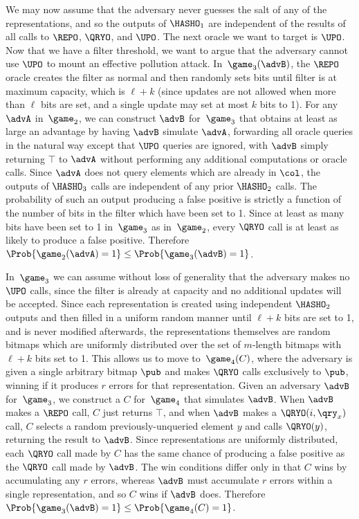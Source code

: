 We may now assume that the adversary never guesses the salt of any of the representations, and so the outputs of $\HASHO_1$ are independent of the results of all calls to $\REPO$, $\QRYO$, and $\UPO$. The next oracle we want to target is $\UPO$. Now that we have a filter threshold, we want to argue that the adversary cannot use $\UPO$ to mount an effective pollution attack. In~$\game_3(\advB)$, the $\REPO$ oracle creates the filter as normal and then randomly sets bits until filter is at maximum capacity, which is $\ell+k$ (since updates are not allowed when more than $\ell$ bits are set, and a single update may set at most $k$ bits to 1). For any $\advA$ in~$\game_2$, we can construct $\advB$ for~$\game_3$ that obtains at least as large an advantage by having $\advB$ simulate $\advA$, forwarding all oracle queries in the natural way except that $\UPO$ queries are ignored, with $\advB$ simply returning $\top$ to $\advA$ without performing any additional computations or oracle calls. Since $\advA$ does not query elements which are already in $\col$, the outputs of $\HASHO_3$ calls are independent of any prior $\HASHO_2$ calls. The probability of such an output producing a false positive is strictly a function of the number of bits in the filter which have been set to 1. Since at least as many bits have been set to 1 in~$\game_3$ as in~$\game_2$, every $\QRYO$ call is at least as likely to produce a false positive. Therefore $\Prob{\game_2(\advA) = 1} \le \Prob{\game_3(\advB) = 1}$.

In~$\game_3$ we can assume without loss of generality that the adversary makes no $\UPO$ calls, since the filter is already at capacity and no additional updates will be accepted. Since each representation is created using independent $\HASHO_2$ outputs and then filled in a uniform random manner until $\ell+k$ bits are set to 1, and is never modified afterwards, the representations themselves are random bitmaps which are uniformly distributed over the set of $m$-length bitmaps with $\ell+k$ bits set to 1. This allows us to move to~$\game_4(C)$, where the adversary is given a single arbitrary bitmap $\pub$ and makes $\QRYO$ calls exclusively to $\pub$, winning if it produces $r$ errors for that representation. Given an adversary $\advB$ for~$\game_3$, we construct a $C$ for~$\game_4$ that simulates $\advB$. When $\advB$ makes a $\REPO$ call, $C$ just returns $\top$, and when $\advB$ makes a $\QRYO(i,\qry_x)$ call, $C$ selects a random previously-unqueried element $y$ and calls $\QRYO(y)$, returning the result to $\advB$. Since representations are uniformly distributed, each $\QRYO$ call made by $C$ has the same chance of producing a false positive as the $\QRYO$ call made by $\advB$. The win conditions differ only in that $C$ wins by accumulating any $r$ errors, whereas $\advB$ must accumulate $r$ errors within a single representation, and so $C$ wins if $\advB$ does. Therefore $\Prob{\game_3(\advB) = 1} \le \Prob{\game_4(C) = 1}$.

